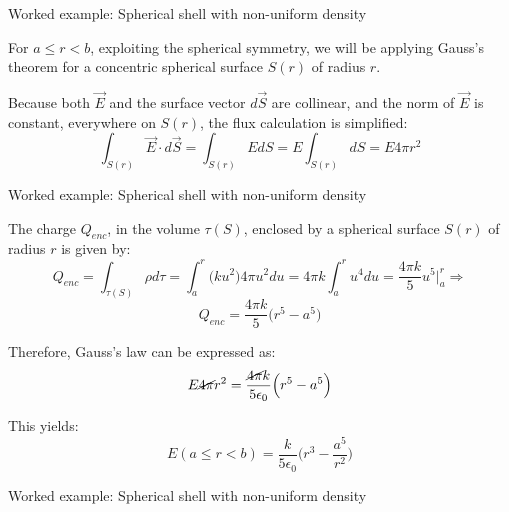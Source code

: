 {\begin{frame}{Worked example: Spherical shell with non-uniform density}
  \vspace{0.2cm}

  For $a \le r < b$, exploiting the spherical symmetry,
  we will be applying Gauss's theorem
  for a concentric spherical surface $S(r)$ of radius $r$.\\

  \vspace{0.2cm}

  Because both $\vec{E}$ and the surface vector $d\vec{S}$ are collinear,
  and the norm of $\vec{E}$ is constant, everywhere on $S(r)$,
  the flux calculation is simplified:
  \begin{equation*}
    \int_{S(r)} \vec{E} \cdot d\vec{S} =
    \int_{S(r)} E dS =
    E \int_{S(r)} dS =
    E 4\pi r^2
  \end{equation*}

\end{frame}

%
%
%

\begin{frame}{Worked example: Spherical shell with non-uniform density}

  The charge $Q_{enc}$, in the volume $\tau(S)$,
  enclosed by a spherical surface $S(r)$ of radius $r$
  is given by:
  \begin{equation*}
    Q_{enc} =
      \int_{\tau(S)} \rho d\tau =
      \int_{a}^{r} \Big( k u^2 \Big) 4\pi u^2 du =
      4\pi k \int_{a}^{r} u^4 du =
      \frac{4\pi k}{5} u^5 \Big\rvert_{a}^{r} \Rightarrow
  \end{equation*}
  \begin{equation*}
      Q_{enc} =
      \frac{4\pi k}{5} \Big(r^5 - a^5\Big)
  \end{equation*}

  Therefore, Gauss's law can be expressed as:
  \begin{equation*}
    E \cancel{4\pi} r^2 =
     \frac{\cancel{4\pi} k}{5 \epsilon_0} \Big(r^5 - a^5\Big)
  \end{equation*}

  This yields:
  \begin{equation*}
    E (a \le r < b)= \frac{k}{5 \epsilon_0} \Big(r^3 - \frac{a^5}{r^2}\Big)
  \end{equation*}

\end{frame}

%
%
%

\begin{frame}{Worked example: Spherical shell with non-uniform density}


\end{frame}}

